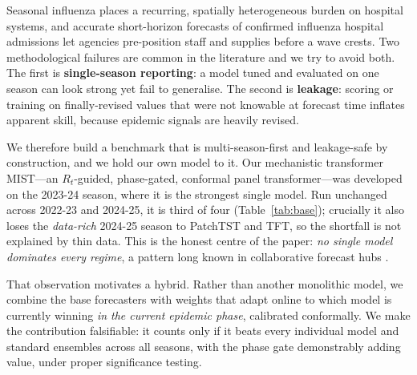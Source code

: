 \documentclass{article}
\begin{document}
Seasonal influenza places a recurring, spatially heterogeneous burden on hospital systems, and
accurate short-horizon forecasts of confirmed influenza hospital admissions let agencies
pre-position staff and supplies before a wave crests. Two methodological failures are common in
the literature and we try to avoid both. The first is \textbf{single-season reporting}: a model
tuned and evaluated on one season can look strong yet fail to generalise. The second is
\textbf{leakage}: scoring or training on finally-revised values that were not knowable at forecast
time inflates apparent skill, because epidemic signals are heavily revised.

We therefore build a benchmark that is multi-season-first and leakage-safe by construction, and we
hold our own model to it. Our mechanistic transformer MIST---an $R_t$-guided, phase-gated,
conformal panel transformer---was developed on the 2023-24 season, where it is the strongest
single model. Run unchanged across 2022-23 and 2024-25, it is third of four (Table~\ref{tab:base});
crucially it also loses the \emph{data-rich} 2024-25 season to PatchTST and TFT, so the
shortfall is not explained by thin data. This is the honest centre of the paper: \emph{no single
model dominates every regime}, a pattern long known in collaborative forecast hubs
\cite{reich2019collaborative,cramer2022covidhub}.

That observation motivates a hybrid. Rather than another monolithic model, we combine the base
forecasters with weights that adapt online to which model is currently winning \emph{in the
current epidemic phase}, calibrated conformally. We make the contribution falsifiable: it counts
only if it beats every individual model and standard ensembles across all seasons, with the phase
gate demonstrably adding value, under proper significance testing.
\end{document}
